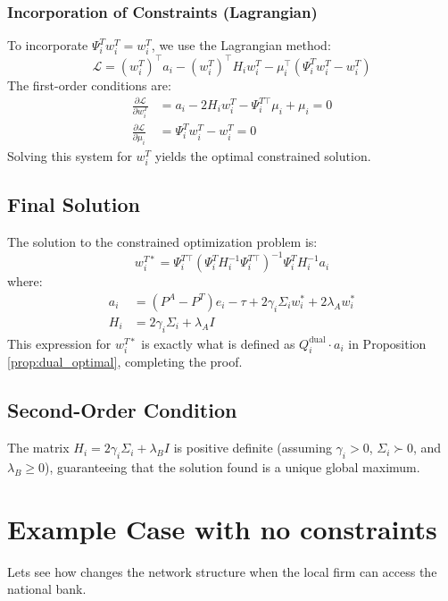\subsubsection{Incorporation of Constraints (Lagrangian)}
To incorporate $\Psi_i^T w_i^T = w_i^T$, we use the Lagrangian method:
\begin{equation}
\mathcal{L} = (w_i^T)^\top a_i - (w_i^T)^\top H_i w_i^T - \mu_i^\top(\Psi_i^T w_i^T - w_i^T)
\end{equation}
The first-order conditions are:
\begin{align}
\frac{\partial \mathcal{L}}{\partial w_i^T} &= a_i - 2H_i w_i^T - \Psi_i^{T\top}\mu_i + \mu_i = 0 \\
\frac{\partial \mathcal{L}}{\partial \mu_i} &= \Psi_i^T w_i^T - w_i^T = 0
\end{align}
Solving this system for $w_i^T$ yields the optimal constrained solution.

\subsection{Final Solution}
The solution to the constrained optimization problem is:
\begin{equation}
\boxed{w_i^{T*} = \Psi_i^{T\top}(\Psi_i^T H_i^{-1} \Psi_i^{T\top})^{-1} \Psi_i^T H_i^{-1} a_i}
\end{equation}
where:
\begin{align}
a_i &= (P^A - P^T)e_i - \tau + 2\gamma_i \Sigma_i w_i^* + 2\lambda_A w_i^* \\
H_i &= 2\gamma_i \Sigma_i + \lambda_A I
\end{align}
This expression for $w_i^{T*}$ is exactly what is defined as $Q_i^{\text{dual}} \cdot a_i$ in Proposition \ref{prop:dual_optimal}, completing the proof.

\subsection{Second-Order Condition}
The matrix $H_i = 2\gamma_i \Sigma_i + \lambda_B I$ is positive definite (assuming $\gamma_i > 0$, $\Sigma_i \succ 0$, and $\lambda_B \geq 0$), guaranteeing that the solution found is a unique global maximum.


\section{Example Case with no constraints}
\label{app:3agnoconstraints}
Lets see how changes the network structure when the local firm can access the national bank.

